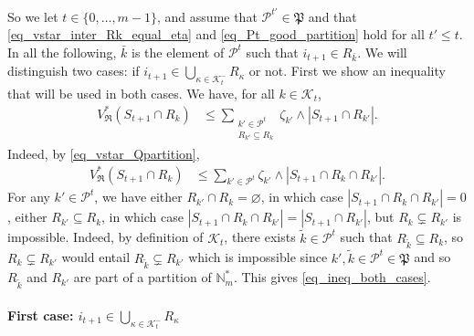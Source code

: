 \documentclass[
  11pt,
  a4paper,
]{article}
\let\oldparagraph\paragraph
\renewcommand{\paragraph}[1]{\oldparagraph{#1}\mbox{}}
\theoremstyle{definition}
\theoremstyle{plain}
\theoremstyle{plain}
\theoremstyle{plain}
\theoremstyle{definition}
\theoremstyle{remark}
\begin{document}
So we let \(t\in\{ 0,\dotsc,m-1\}\), and assume that
\(\mathcal{P}^{t'}\in\mathfrak P\) and that
\eqref{eq_vstar_inter_Rk_equal_eta} and \eqref{eq_Pt_good_partition}
hold for all \(t'\leq t\). In all the following, \(\bar k\) is the
element of \(\mathcal{P}^t\) such that \(i_{t+1}\in R_{\bar k}\). We
will distinguish two cases: if
\(i_{t+1}\in\bigcup_{\kappa\in\mathcal{K}^-_{t}}R_{\kappa}\) or not.
First we show an inequality that will be used in both cases. We have,
for all \(k\in\mathcal{K}_t\), \begin{align}
V^*_{\mathfrak{R}}(S_{t+1}\cap R_k)&\leq \sum_{\substack{k'\in\mathcal{P}^{t}\\R_{k'}\subseteq R_k}} \zeta_{k'}\wedge |S_{t+1}\cap R_{k'}|.\label{eq_ineq_both_cases}
\end{align} Indeed, by \eqref{eq_vstar_Qpartition}, \begin{align*}
V^*_{\mathfrak{R}}(S_{t+1}\cap R_k)&\leq  \sum_{k'\in\mathcal{P}^{t}} \zeta_{k'}\wedge |S_{t+1}\cap R_k \cap R_{k'}|.
\end{align*} For any \(k'\in\mathcal{P}^{t}\), we have either
\(R_{k'}\cap R_k=\varnothing\), in which case
\(|S_{t+1}\cap R_k \cap R_{k'}|=0\), either \(R_{k'}\subseteq R_k\), in
which case \(|S_{t+1}\cap R_k \cap R_{k'}|=|S_{t+1} \cap R_{k'}|\), but
\(R_{k}\subsetneq R_{k'}\) is impossible. Indeed, by definition of
\(\mathcal{K}_t\), there exists \(\tilde k\in \mathcal{P}^t\) such that
\(R_{\tilde k}\subseteq R_k\), so \(R_{k}\subsetneq R_{k'}\) would
entail \(R_{\tilde k}\subsetneq R_{k'}\) which is impossible since
\(k', \tilde k\in \mathcal{P}^t\in\mathfrak P\) and so \(R_{\tilde k}\)
and \(R_{k'}\) are part of a partition of \(\mathbb{N}_m^*\). This gives
\eqref{eq_ineq_both_cases}.

\paragraph{\texorpdfstring{First case:
\(i_{t+1}\in\bigcup_{\kappa\in\mathcal{K}^-_{t}}R_{\kappa}\)}{First case: i\_\{t+1\}\textbackslash in\textbackslash bigcup\_\{\textbackslash kappa\textbackslash in\textbackslash mathcal\{K\}\^{}-\_\{t\}\}R\_\{\textbackslash kappa\}}}\label{first-case-i_t1inbigcup_kappainmathcalk-_tr_kappa}
\end{document}
